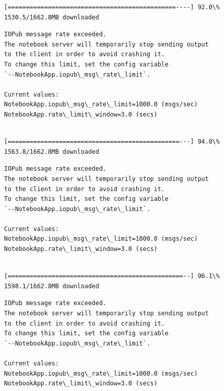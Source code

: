 \documentclass[11pt]{article}
\begin{document}
    \begin{Verbatim}[commandchars=\\\{\}]
[==============================================----] 92.0\% 1530.5/1662.8MB downloaded
    \end{Verbatim}

    \begin{Verbatim}[commandchars=\\\{\}]
IOPub message rate exceeded.
The notebook server will temporarily stop sending output
to the client in order to avoid crashing it.
To change this limit, set the config variable
`--NotebookApp.iopub\_msg\_rate\_limit`.

Current values:
NotebookApp.iopub\_msg\_rate\_limit=1000.0 (msgs/sec)
NotebookApp.rate\_limit\_window=3.0 (secs)


    \end{Verbatim}

    \begin{Verbatim}[commandchars=\\\{\}]
[===============================================---] 94.0\% 1563.8/1662.8MB downloaded
    \end{Verbatim}

    \begin{Verbatim}[commandchars=\\\{\}]
IOPub message rate exceeded.
The notebook server will temporarily stop sending output
to the client in order to avoid crashing it.
To change this limit, set the config variable
`--NotebookApp.iopub\_msg\_rate\_limit`.

Current values:
NotebookApp.iopub\_msg\_rate\_limit=1000.0 (msgs/sec)
NotebookApp.rate\_limit\_window=3.0 (secs)


    \end{Verbatim}

    \begin{Verbatim}[commandchars=\\\{\}]
[================================================--] 96.1\% 1598.1/1662.8MB downloaded
    \end{Verbatim}

    \begin{Verbatim}[commandchars=\\\{\}]
IOPub message rate exceeded.
The notebook server will temporarily stop sending output
to the client in order to avoid crashing it.
To change this limit, set the config variable
`--NotebookApp.iopub\_msg\_rate\_limit`.

Current values:
NotebookApp.iopub\_msg\_rate\_limit=1000.0 (msgs/sec)
NotebookApp.rate\_limit\_window=3.0 (secs)


    \end{Verbatim}
\end{document}
